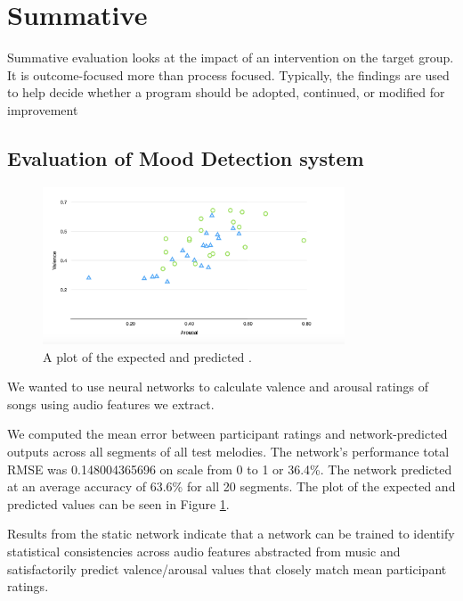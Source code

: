 \section{Summative}
Summative evaluation looks at the impact of an intervention on the target group. It is outcome-focused more than process focused. Typically, the findings are used to help decide whether a program should be adopted, continued, or modified for improvement

\vspace{10pt}

\subsection{Evaluation of Mood Detection system}

\begin{figure}[t]
    \includegraphics[width=0.8\textwidth]{Figures/evalNN}
    \centering

  \caption{A plot of the expected and predicted .}
  \label{fig:anneval}
\end{figure}


We wanted to use neural networks to calculate valence and arousal ratings of songs using audio features we extract. 

We computed the mean error between participant ratings and network-predicted outputs across all segments of all test melodies. The network's performance total RMSE was 0.148004365696 on scale from 0 to 1 or 36.4\%.
The network predicted at an average accuracy of 63.6\% for all 20 segments. The plot of the expected and predicted values can be seen in Figure \ref{fig:anneval}.

Results from the static network indicate that a network can be trained to identify statistical consistencies across audio features abstracted from music and satisfactorily predict valence/arousal values that closely match mean participant ratings.



